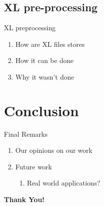 \documentclass[13.7pt]{beamer}
\begin{document}
\subsection{XL pre-processing}
\begin{frame}{XL preprocessing}
    \begin{enumerate}
        \item{How are XL files stores}
  \pause\item{How it can be done}
  \pause\item{Why it wasn't done}
    \end{enumerate}

\end{frame}

\section{Conclusion}
\begin{frame}{Final Remarks}
    \begin{enumerate}
        \item{Our opinions on our work}
  \pause\item{Future work}
  \pause\begin{enumerate}
      \item{Real world applications?}
        \end{enumerate}
    \end{enumerate}
\end{frame}
\begin{frame}
    \huge{\textbf{Thank You!}}
\end{frame}
\end{document}
